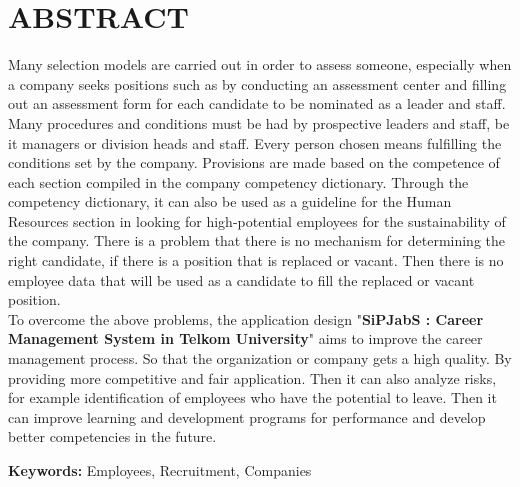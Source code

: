 
\chapter*{ABSTRACT}
\vspace*{0.7cm}

Many selection models are carried out in order to assess someone, especially when a company seeks positions such as by conducting an assessment center and filling out an assessment form for each candidate to be nominated as a leader and staff. Many procedures and conditions must be had by prospective leaders and staff, be it managers or division heads and staff. Every person chosen means fulfilling the conditions set by the company. Provisions are made based on the competence of each section compiled in the company competency dictionary. Through the competency dictionary, it can also be used as a guideline for the Human Resources section in looking for high-potential employees for the sustainability of the company. There is a problem that there is no mechanism for determining the right candidate, if there is a position that is replaced or vacant. Then there is no employee data that will be used as a candidate to fill the replaced or vacant position.
\\

To overcome the above problems, the application design "\textbf{SiPJabS : Career Management System in Telkom University}" aims to improve the career management process. So that the organization or company gets a high quality. By providing more competitive and fair application. Then it can also analyze risks, for example identification of employees who have the potential to leave. Then it can improve learning and development programs for performance and develop better competencies in the future.

\noindent \textbf{Keywords:} Employees, Recruitment, Companies\\ 

\newpage